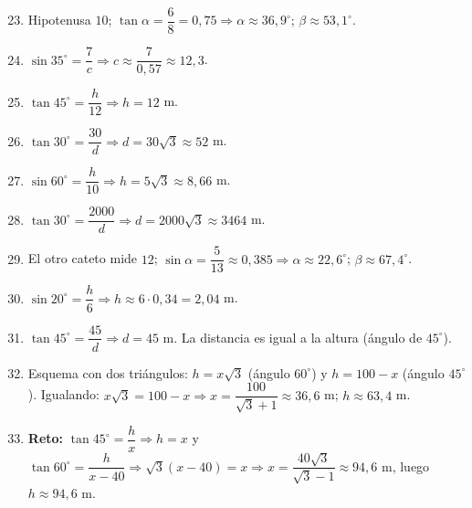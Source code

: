 \documentclass[12pt, letterpaper]{article}
\providecommand{\sen}{\sin}
\begin{document}
  \begin{enumerate}[leftmargin=*, label=\textbf{\arabic*.}]
    \setcounter{enumi}{22}
    \item Hipotenusa $10$; $\tan \alpha = \dfrac{6}{8} = 0{,}75 \Rightarrow \alpha \approx 36{,}9^{\circ}$; $\beta \approx 53{,}1^{\circ}$.
    \item $\sen 35^{\circ} = \dfrac{7}{c} \Rightarrow c \approx \dfrac{7}{0{,}57} \approx 12{,}3$.
    \item $\tan 45^{\circ} = \dfrac{h}{12} \Rightarrow h = 12$ m.
    \item $\tan 30^{\circ} = \dfrac{30}{d} \Rightarrow d = 30\sqrt{3} \approx 52$ m.
    \item $\sen 60^{\circ} = \dfrac{h}{10} \Rightarrow h = 5\sqrt{3} \approx 8{,}66$ m.
    \item $\tan 30^{\circ} = \dfrac{2000}{d} \Rightarrow d = 2000\sqrt{3} \approx 3464$ m.
    \item El otro cateto mide $12$; $\sen \alpha = \dfrac{5}{13} \approx 0{,}385 \Rightarrow \alpha \approx 22{,}6^{\circ}$; $\beta \approx 67{,}4^{\circ}$.
    \item $\sen 20^{\circ} = \dfrac{h}{6} \Rightarrow h \approx 6 \cdot 0{,}34 = 2{,}04$ m.
    \item $\tan 45^{\circ} = \dfrac{45}{d} \Rightarrow d = 45$ m. La distancia es igual a la altura (ángulo de $45^{\circ}$).
    \item Esquema con dos triángulos: $h = x\sqrt{3}$ (ángulo $60^{\circ}$) y $h = 100 - x$ (ángulo $45^{\circ}$). Igualando: $x\sqrt{3} = 100 - x \Rightarrow x = \dfrac{100}{\sqrt{3}+1} \approx 36{,}6$ m; $h \approx 63{,}4$ m.
    \item \textbf{Reto:} $\tan 45^{\circ} = \dfrac{h}{x} \Rightarrow h = x$ y $\tan 60^{\circ} = \dfrac{h}{x-40} \Rightarrow \sqrt{3}(x-40) = x \Rightarrow x = \dfrac{40\sqrt{3}}{\sqrt{3}-1} \approx 94{,}6$ m, luego $h \approx 94{,}6$ m.
  \end{enumerate}

  \vspace{8pt}

\fi
\end{document}
